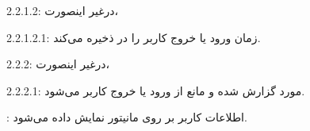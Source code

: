 \documentclass[oneside,a4paper,12pt]{book}
\begin{document}
\hspace{1cm} 2.2.1.2: درغیر اینصورت،\vspace{4mm}

\hspace{2cm} 2.2.1.2.1: زمان ورود یا خروج کاربر را در  ذخیره می‌کند.\vspace{4mm}

2.2.2: درغیر اینصورت،\vspace{4mm}

\hspace{1cm} 2.2.2.1: مورد گزارش شده و مانع از ورود یا خروج کاربر می‌شود.\vspace{4mm}

: اطلاعات کاربر بر روی مانیتور نمایش داده می‌شود.\\\\
\end{document}
